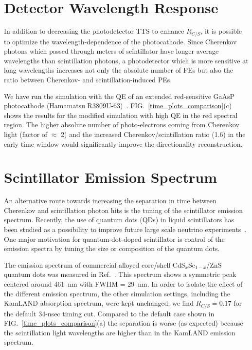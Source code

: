 \documentclass[aps,prc,twocolumn,groupedaddress,showpacs,amsmath,amssymb,floatfix,superscriptaddress]{revtex4}
\begin{document}
\section{Detector Wavelength Response}
\label{detector_wavelength_response_sec} 
In addition to decreasing the photodetector TTS to enhance $R_{C/S}$,
it is possible to optimize the wavelength-dependence of the
photocathode. Since Cherenkov photons which passed through meters of
scintillator have longer average wavelengths than scintillation
photons, a photodetector which is more sensitive at long wavelengths
increases not only the absolute number of PEs but also the ratio
between Cherenkov- and scintillation-induced PEs.

We have run the simulation with the QE of an extended red-sensitive
GaAsP photocathode (Hamamatsu R3809U-63)~\cite{Hamamatsu_R3899U}.
FIG.~\ref{time_plots_comparison}(c) shows the results for the
modified simulation with high QE in the red spectral region. The
higher absolute number of photo-electrons coming from Cherenkov light
(factor of $\approx$ 2) and the increased Cherenkov/scintillation
ratio (1.6) in the early time window would significantly improve the
directionality reconstruction.

\section{Scintillator Emission Spectrum}
\label{scintillator_emission_sec}
An alternative route towards increasing the separation in time between
Cherenkov and scintillation photon hits is the tuning of the
scintillator emission spectrum. Recently, the use of quantum dots
(QDs) in liquid scintillators has been studied as a possibility to
improve future large scale neutrino experiments~\cite{qdot2}. One
major motivation for quantum-dot-doped scintillator is control of the
emission spectra by tuning the size or composition of the quantum
dots. 

The emission spectrum of commercial alloyed core/shell
CdS$_x$Se$_{1-x}$/ZnS quantum dots was measured in
Ref.~\cite{qdot2}. This spectrum shows a symmetric peak centered
around 461~nm with FWHM = 29~nm.  In order to isolate the effect of
the different emission spectrum, the other simulation settings,
including the KamLAND absorption spectrum, were kept unchanged; we
find $R_{C/S}=0.17$ for the default 34-nsec timing cut.  Compared to
the default case shown in FIG.~\ref{time_plots_comparison}(a) the
separation is worse (as expected) because the scintillation light
wavelengths are higher than in the KamLAND emission spectrum.
\end{document}
